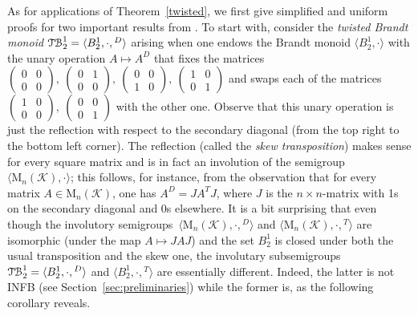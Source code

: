 \documentclass[smallextended]{svjour3}
\newcommand{\sgp}{semi\-group}
\newcommand{\sgps}{semi\-groups}
\newcommand{\iss}{involutory semi\-groups}
\newcommand{\TB}{\ensuremath{\mathcal{T\kern-.5pt B}_2^1}}
\begin{document}
As for applications of Theorem~\ref{twisted}, we first give simplified and uniform proofs for two important results from \cite{ADV:2012}.
To start with, consider the \emph{twisted Brandt monoid} $\TB=\langle B_2^1,\cdot,{}^D\rangle$ arising when one endows the Brandt monoid
$\langle B_2^1,\cdot\rangle$ with the unary operation $A\mapsto A^D$ that fixes the matrices $\left(\begin{smallmatrix} 0 & 0\\ 0 &
0\end{smallmatrix}\right),\ \left(\begin{smallmatrix} 0 & 1\\ 0 & 0\end{smallmatrix}\right),\ \left(\begin{smallmatrix} 0 & 0\\ 1 &
0\end{smallmatrix}\right),\ \left(\begin{smallmatrix} 1 & 0\\ 0 & 1\end{smallmatrix}\right)$ and swaps each of the matrices
$\left(\begin{smallmatrix}1 & 0\\ 0 & 0\end{smallmatrix}\right),\ \left(\begin{smallmatrix} 0 & 0\\ 0 & 1\end{smallmatrix}\right)$ with the
other one. Observe that this unary operation is just the reflection with respect to the secondary diagonal (from the top right to the
bottom left corner). The reflection (called the \emph{skew transposition}) makes sense for every square matrix and is in fact an involution
of the \sgp\ $\langle\mathrm{M}_n(\mathcal{K}),\cdot\rangle$; this follows, for instance, from the observation that for every matrix
$A\in\mathrm{M}_n(\mathcal{K})$, one has $A^D=JA^TJ$, where $J$ is the $n\times n$-matrix with 1s on the secondary diagonal and 0s
elsewhere. It is a bit surprising that even though the \iss\ $\langle\mathrm{M}_n(\mathcal{K}),\cdot,{}^D\rangle$ and
$\langle\mathrm{M}_n(\mathcal{K}),\cdot,{}^T\rangle$ are isomorphic (under the map $A\mapsto JAJ$) and the set $B_2^1$ is closed under both
the usual transposition and the skew one, the involutary sub\sgps\ $\TB=\langle B_2^1,\cdot,{}^D\rangle$ and $\langle
B_2^1,\cdot,{}^T\rangle$ are essentially different. Indeed, the latter is not INFB (see Section~\ref{sec:preliminaries}) while the former
is, as the following corollary reveals.
\end{document}
